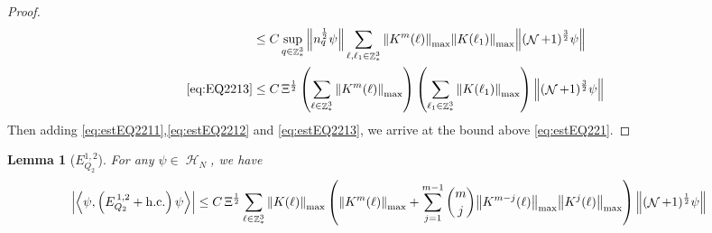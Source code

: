 \documentclass[sn-mathphys, Numbered ,a4paper]{sn-jnl}%
\DeclareMathOperator{\Z}{\mathbb{Z}}
\DeclareMathOperator{\HH}{\mathcal{H}}
\DeclareMathOperator{\NN}{\mathcal{N}}
\newcommand{\half}{\frac{1}{2}}
\newcommand{\eva}[1]{\left\langle #1 \right\rangle}
\theoremstyle{plain}
\newtheorem{lemma}[theorem]{Lemma}
\theoremstyle{definition}
\theoremstyle{remark}
\theoremstyle{plain}
\theoremstyle{definition}
\theoremstyle{remark}
\begin{document}
\begin{proof}
\begin{align}
 	&\leq C \sup\limits_{q \in \Z^3_*} \norm{ n^\half_{q} \psi}\sum\limits_{\ell, \ell_1\in \Z^3_*} \norm{K^m(\ell)}_{\mathrm{max}} \norm{ K(\ell_1)}_{\mathrm{max}} \norm{ (\NN+1)^{\frac{3}{2}} \psi } \nonumber\\
 	\eqref{eq:EQ2213}&\leq  C \,\Xi^\half \left(\sum\limits_{\ell \in \Z^3_*} \norm{K^m(\ell)}_{\mathrm{max}}\right)\left( \sum\limits_{\ell_1\in \Z^3_*} \norm{ K(\ell_1)}_{\mathrm{max}} \right) \norm{ (\NN+1)^{\frac{3}{2}} \psi }\label{eq:estEQ2213}
 \end{align}
 Then adding \eqref{eq:estEQ2211},\eqref{eq:estEQ2212} and \eqref{eq:estEQ2213}, we arrive at the bound above \eqref{eq:estEQ221}. 
\end{proof}

\begin{lemma}[$E_{Q_2}^{1,2}$]
    For any $\psi \in \HH_N$, we have
    \begin{align}
    	\abs{\eva{\psi,\left(E^{\,1,2}_{Q_2}+\mathrm{h.c.}\right) \psi }}
    	&\leq   C\,\Xi^\half \sum\limits_{\ell \in \Z^3_*} \norm{K(\ell)}_{\mathrm{max}} \left(\norm{K^m(\ell)}_{\mathrm{max}} + \sum\limits_{j=1}^{m-1} {{m}\choose j} \norm{K^{m-j}(\ell)}_{\mathrm{max}} \norm{K^j(\ell)}_{\mathrm{max}}\right)  \norm{  (\NN+1)^\half \psi} \label{eq:estEQ212}
    \end{align}
\end{lemma}
\end{document}
